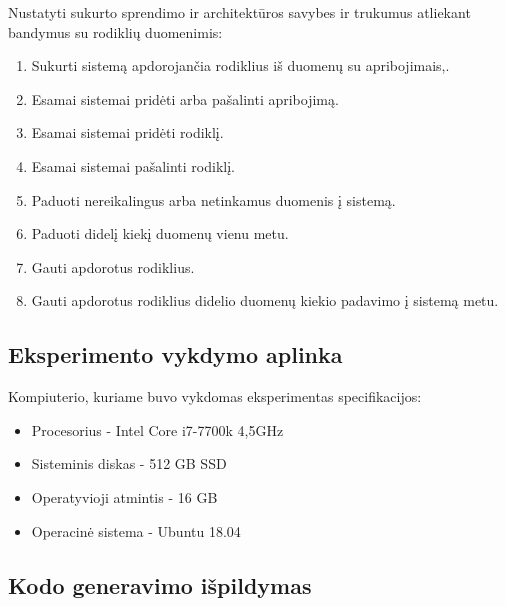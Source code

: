 \documentclass{VUMIFPSbakalaurinis}
\begin{document}
Nustatyti sukurto sprendimo ir architektūros savybes ir trukumus atliekant bandymus su rodiklių duomenimis:
\begin{enumerate}
    \item Sukurti sistemą apdorojančia rodiklius iš duomenų su apribojimais,.
    \item Esamai sistemai pridėti arba pašalinti apribojimą.
    \item Esamai sistemai pridėti rodiklį.
    \item Esamai sistemai pašalinti rodiklį. 
    \item Paduoti nereikalingus arba netinkamus duomenis į sistemą.
    \item Paduoti didelį kiekį duomenų vienu metu.
    \item Gauti apdorotus rodiklius.
    \item Gauti apdorotus rodiklius didelio duomenų kiekio padavimo į sistemą metu.
\end{enumerate}

\subsection{Eksperimento vykdymo aplinka}

Kompiuterio, kuriame buvo vykdomas eksperimentas specifikacijos:
\begin{itemize}
    \item Procesorius - Intel Core i7-7700k 4,5GHz
    \item Sisteminis diskas -  512 GB SSD
    \item Operatyvioji atmintis - 16 GB 
    \item Operacinė sistema - Ubuntu 18.04
\end{itemize}

\subsection{Kodo generavimo išpildymas}
\end{document}

